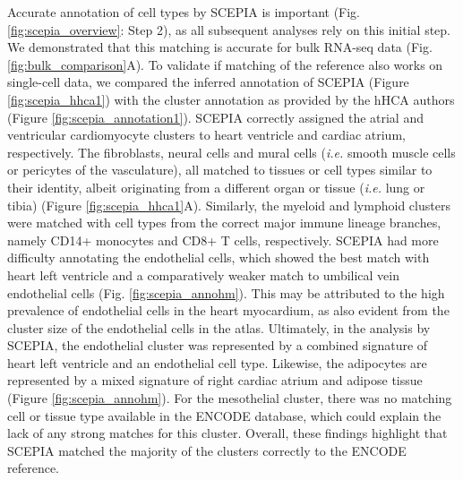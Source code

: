 Accurate annotation of cell types by SCEPIA is important (Fig. \ref{fig:scepia_overview}: Step 2), as all subsequent analyses rely on this initial step. We demonstrated that this matching is accurate for bulk RNA-seq data (Fig. \ref{fig:bulk_comparison}A). To validate if matching of the reference also works on single-cell data, we compared the inferred annotation of SCEPIA (Figure \ref{fig:scepia_hhca1}) with the cluster annotation as provided by the hHCA authors (Figure \ref{fig:scepia_annotation1}). SCEPIA correctly assigned the atrial and ventricular cardiomyocyte clusters to heart ventricle and cardiac atrium, respectively. The fibroblasts, neural cells and mural cells (\textit{i.e.} smooth muscle cells or pericytes of the vasculature), all matched to tissues or cell types similar to their identity, albeit originating from a different organ or tissue (\textit{i.e.} lung or tibia) (Figure \ref{fig:scepia_hhca1}A). Similarly, the myeloid and lymphoid clusters were matched with cell types from the correct major immune lineage branches, namely CD14+ monocytes and CD8+ T cells, respectively. SCEPIA had more difficulty annotating the endothelial cells, which showed the best match with heart left ventricle and a comparatively weaker match to umbilical vein endothelial cells (Fig. \ref{fig:scepia_annohm}). This may be attributed to the high prevalence of endothelial cells in the heart myocardium, as also evident from the cluster size of the endothelial cells in the atlas. Ultimately, in the analysis by SCEPIA, the endothelial cluster was represented by a combined signature of heart left ventricle and an endothelial cell type. Likewise, the adipocytes are represented by a mixed signature of right cardiac atrium and adipose tissue (Figure \ref{fig:scepia_annohm}). For the mesothelial cluster, there was no matching cell or tissue type available in the ENCODE database, which could explain the lack of any strong matches for this cluster. Overall, these findings highlight that SCEPIA matched the majority of the clusters correctly to the ENCODE reference. 

